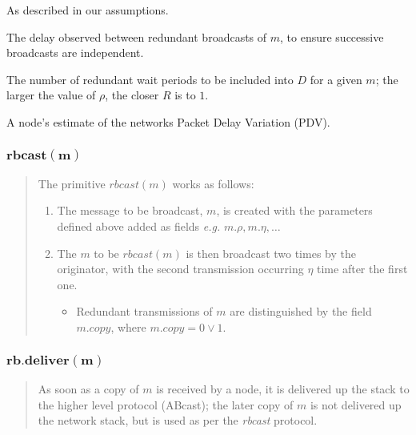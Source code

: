     \begin{description}[leftmargin=1cm, labelindent=1cm]
        \item[$\bm{x_{mx}}$ \textnormal{and}  $\bm{q}$ - ]    As described in our assumptions.
        
        \item[$\bm{\eta}$ - ]    The delay observed between redundant broadcasts of $m$, to ensure successive broadcasts are independent.  

        \item[$\bm{\rho}$ - ]    The number of redundant wait periods to be included into $D$ for a given $m$; the larger the value of $\rho$, the closer $R$ is to $1$.  
        
        \item[$\bm{\omega}$ - ]    A node's estimate of the networks Packet Delay Variation (PDV).  
        \end{description}
    
    \subsubsection*{$\bm{rbcast(m)}$}
    \begin{quotation}
    \noindent The primitive $rbcast(m)$ works as follows:
    \begin{enumerate}[label=\roman*]
        \item    The message to be broadcast, $m$, is created with the parameters defined above added as fields \emph{e.g.} $m.\rho, m.\eta, \ldots$ 
        
        \item    The $m$ to be $rbcast(m)$ is then broadcast two times by the originator, with the second transmission occurring $\eta$ time after the first one.  
        
        \begin{itemize}
            \item    Redundant transmissions of $m$ are distinguished by the field $m.copy$, where $m.copy = 0 \lor 1$.  
        \end{itemize}
    \end{enumerate}
        \end{quotation}

    
     \subsubsection*{$\bm{rb.deliver(m)}$}
	     \begin{quotation}
	     As soon as a copy of $m$ is received by a node, it is delivered up the stack to the higher level protocol (\textsf{ABcast}); the later copy of $m$ is not delivered up the network stack, but is used as per the \emph{rbcast} protocol.  
	     \end{quotation}
	         
